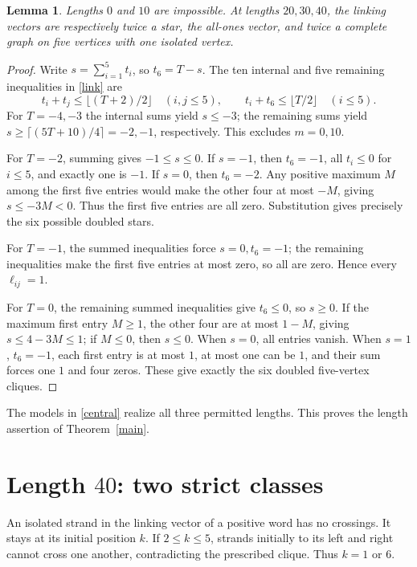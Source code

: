 \documentclass[11pt]{article}
\newtheorem{lemma}{Lemma}
\begin{document}
\begin{lemma}\label{patterns}
Lengths \(0\) and \(10\) are impossible. At lengths \(20,30,40\),
the linking vectors are respectively twice a star, the all-ones
vector, and twice a complete graph on five vertices with one
isolated vertex.
\end{lemma}
\begin{proof}
Write \(s=\sum_{i=1}^5t_i\), so \(t_6=T-s\).
The ten internal and five remaining inequalities in \eqref{link} are
\[
 t_i+t_j\leq\lfloor(T+2)/2\rfloor\quad(i,j\leq5),\qquad
 t_i+t_6\leq\lfloor T/2\rfloor\quad(i\leq5).
\]
For \(T=-4,-3\) the internal sums yield \(s\leq-3\);
the remaining sums yield
\(s\geq\lceil(5T+10)/4\rceil=-2,-1\), respectively.
This excludes \(m=0,10\).

For \(T=-2\), summing gives \(-1\leq s\leq0\).
If \(s=-1\), then \(t_6=-1\), all \(t_i\leq0\) for \(i\leq5\),
and exactly one is \(-1\). If \(s=0\), then \(t_6=-2\).
Any positive maximum \(M\) among the first five entries would make
the other four at most \(-M\), giving \(s\leq-3M<0\).
Thus the first five entries are all zero.
Substitution gives precisely the six possible doubled stars.

For \(T=-1\), the summed inequalities force \(s=0,t_6=-1\);
the remaining inequalities make the first five entries at most zero,
so all are zero. Hence every \(\ell_{ij}=1\).

For \(T=0\), the remaining summed inequalities give \(t_6\leq0\),
so \(s\geq0\). If the maximum first entry \(M\geq1\), the other four
are at most \(1-M\), giving \(s\leq4-3M\leq1\);
if \(M\leq0\), then \(s\leq0\).
When \(s=0\), all entries vanish. When \(s=1\), \(t_6=-1\),
each first entry is at most \(1\), at most one can be \(1\),
and their sum forces one \(1\) and four zeros.
These give exactly the six doubled five-vertex cliques.
\end{proof}
The models in \eqref{central} realize all three permitted lengths.
This proves the length assertion of Theorem~\ref{main}.

\section{Length \texorpdfstring{\(40\)}{40}: two strict classes}
An isolated strand in the linking vector of a positive word has
no crossings. It stays at its initial position \(k\).
If \(2\leq k\leq5\), strands initially to its left and right cannot
cross one another, contradicting the prescribed clique.
Thus \(k=1\) or \(6\).
\end{document}
